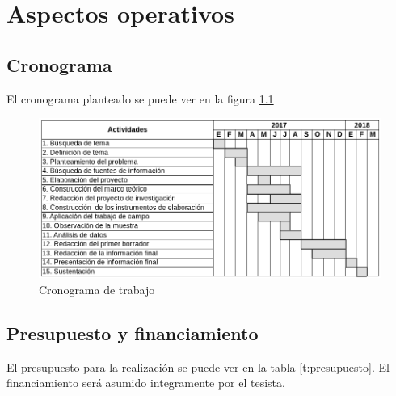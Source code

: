 \chapter{Aspectos operativos}
\section{Cronograma}
El cronograma planteado se puede ver en la figura \ref{fig:cronograma}

\begin{figure}[h]
    \centering
    \captionsetup{justification=centering}
    \includegraphics[width=1.0\textwidth]{Imagenes/Bitmap/cronograma}
    \caption{Cronograma de trabajo}
    \label{fig:cronograma}
\end{figure}

\section{Presupuesto y financiamiento}
El presupuesto para la realización se puede ver en la tabla \ref{t:presupuesto}.
El financiamiento será asumido integramente por el tesista.

